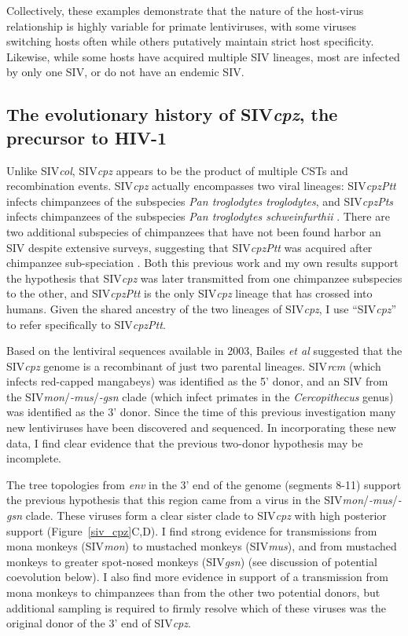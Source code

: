 Collectively, these examples demonstrate that the nature of the host-virus relationship is highly variable for primate lentiviruses, with some viruses switching hosts often while others putatively maintain strict host specificity.
Likewise, while some hosts have acquired multiple SIV lineages, most are infected by only one SIV, or do not have an endemic SIV.

\subsection{The evolutionary history of SIV\textit{cpz}, the precursor to HIV-1}
Unlike SIV\textit{col}, SIV\textit{cpz} appears to be the product of multiple CSTs and recombination events.
SIV\textit{cpz} actually encompasses two viral lineages: SIV\textit{cpzPtt} infects chimpanzees of the subspecies \textit{Pan troglodytes troglodytes}, and SIV\textit{cpzPts} infects chimpanzees of the subspecies \textit{Pan troglodytes schweinfurthii} \citep{santiago2002SIVcpz}.
There are two additional subspecies of chimpanzees that have not been found harbor an SIV despite extensive surveys, suggesting that SIV\textit{cpzPtt} was acquired after chimpanzee sub-speciation \citep{leitner2007sequence}.
Both this previous work and my own results support the hypothesis that SIV\textit{cpz} was later transmitted from one chimpanzee subspecies to the other, and SIV\textit{cpzPtt} is the only SIV\textit{cpz} lineage that has crossed into humans.
Given the shared ancestry of the two lineages of SIV\textit{cpz}, I use “SIV\textit{cpz}” to refer specifically to SIV\textit{cpzPtt}.

Based on the lentiviral sequences available in 2003, Bailes \textit{et al} \citep{bailes2003hybrid} suggested that the SIV\textit{cpz} genome is a recombinant of just two parental lineages.
SIV\textit{rcm} (which infects red-capped mangabeys) was identified as the 5' donor, and an SIV from the SIV\textit{mon}/\textit{-mus}/\textit{-gsn} clade (which infect primates in the \textit{Cercopithecus} genus) was identified as the 3' donor.
Since the time of this previous investigation many new lentiviruses have been discovered and sequenced.
In incorporating these new data, I find clear evidence that the previous two-donor hypothesis may be incomplete.

The tree topologies from \textit{env} in the 3' end of the genome (segments 8-11) support the previous hypothesis \citep{bailes2003hybrid} that this region came from a virus in the SIV\textit{mon}/\textit{-mus}/\textit{-gsn} clade.
These viruses form a clear sister clade to SIV\textit{cpz} with high posterior support (Figure~\ref{siv_cpz}C,D).
I find strong evidence for transmissions from mona monkeys (SIV\textit{mon}) to mustached monkeys (SIV\textit{mus}), and from mustached monkeys to greater spot-nosed monkeys (SIV\textit{gsn}) (see discussion of potential coevolution below).
I also find more evidence in support of a transmission from mona monkeys to chimpanzees than from the other two potential donors, but additional sampling is required to firmly resolve which of these viruses was the original donor of the 3' end of SIV\textit{cpz}.


